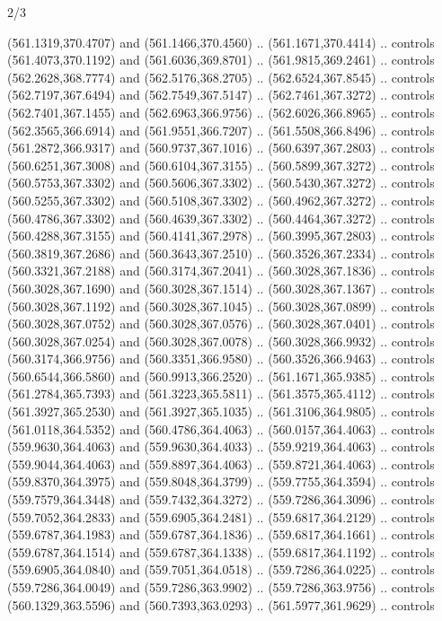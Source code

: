\begin{flagdescription}{2/3}
\begin{scope}[xshift=0.5\flaglength,yshift=0.5\flagwidth,scale=\flagwidth/495.65]
\begin{scope}[y=0.8pt, x=0.8pt, yscale=-1,shift={(-463.76,-309.78)}]
  (561.1319,370.4707) and (561.1466,370.4560) .. (561.1671,370.4414) .. controls
  (561.4073,370.1192) and (561.6036,369.8701) .. (561.9815,369.2461) .. controls
  (562.2628,368.7774) and (562.5176,368.2705) .. (562.6524,367.8545) .. controls
  (562.7197,367.6494) and (562.7549,367.5147) .. (562.7461,367.3272) .. controls
  (562.7401,367.1455) and (562.6963,366.9756) .. (562.6026,366.8965) .. controls
  (562.3565,366.6914) and (561.9551,366.7207) .. (561.5508,366.8496) .. controls
  (561.2872,366.9317) and (560.9737,367.1016) .. (560.6397,367.2803) .. controls
  (560.6251,367.3008) and (560.6104,367.3155) .. (560.5899,367.3272) .. controls
  (560.5753,367.3302) and (560.5606,367.3302) .. (560.5430,367.3272) .. controls
  (560.5255,367.3302) and (560.5108,367.3302) .. (560.4962,367.3272) .. controls
  (560.4786,367.3302) and (560.4639,367.3302) .. (560.4464,367.3272) .. controls
  (560.4288,367.3155) and (560.4141,367.2978) .. (560.3995,367.2803) .. controls
  (560.3819,367.2686) and (560.3643,367.2510) .. (560.3526,367.2334) .. controls
  (560.3321,367.2188) and (560.3174,367.2041) .. (560.3028,367.1836) .. controls
  (560.3028,367.1690) and (560.3028,367.1514) .. (560.3028,367.1367) .. controls
  (560.3028,367.1192) and (560.3028,367.1045) .. (560.3028,367.0899) .. controls
  (560.3028,367.0752) and (560.3028,367.0576) .. (560.3028,367.0401) .. controls
  (560.3028,367.0254) and (560.3028,367.0078) .. (560.3028,366.9932) .. controls
  (560.3174,366.9756) and (560.3351,366.9580) .. (560.3526,366.9463) .. controls
  (560.6544,366.5860) and (560.9913,366.2520) .. (561.1671,365.9385) .. controls
  (561.2784,365.7393) and (561.3223,365.5811) .. (561.3575,365.4112) .. controls
  (561.3927,365.2530) and (561.3927,365.1035) .. (561.3106,364.9805) .. controls
  (561.0118,364.5352) and (560.4786,364.4063) .. (560.0157,364.4063) .. controls
  (559.9630,364.4063) and (559.9630,364.4033) .. (559.9219,364.4063) .. controls
  (559.9044,364.4063) and (559.8897,364.4063) .. (559.8721,364.4063) .. controls
  (559.8370,364.3975) and (559.8048,364.3799) .. (559.7755,364.3594) .. controls
  (559.7579,364.3448) and (559.7432,364.3272) .. (559.7286,364.3096) .. controls
  (559.7052,364.2833) and (559.6905,364.2481) .. (559.6817,364.2129) .. controls
  (559.6787,364.1983) and (559.6787,364.1836) .. (559.6817,364.1661) .. controls
  (559.6787,364.1514) and (559.6787,364.1338) .. (559.6817,364.1192) .. controls
  (559.6905,364.0840) and (559.7051,364.0518) .. (559.7286,364.0225) .. controls
  (559.7286,364.0049) and (559.7286,363.9902) .. (559.7286,363.9756) .. controls
  (560.1329,363.5596) and (560.7393,363.0293) .. (561.5977,361.9629) .. controls

\end{scope}
\end{scope}
\end{flagdescription}
